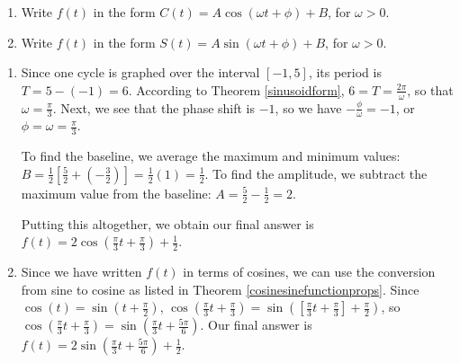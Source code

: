 \documentclass{ximera}
\begin{document}
\begin{example}
\begin{image}
\end{image}

\begin{enumerate}

\item Write $f(t)$ in the form  $C(t) = A \cos(\omega t + \phi) + B$, for $\omega > 0$.

\item Write $f(t)$ in the form  $S(t) = A \sin(\omega t + \phi) + B$, for $\omega > 0$.

\end{enumerate}

\begin{explanation}

\begin{enumerate}

\item  Since one cycle is graphed over the interval $[-1,5]$, its period is $T=5-(-1) = 6$.  According to Theorem \ref{sinusoidform}, $6 = T = \frac{2\pi}{\omega}$, so that $\omega = \frac{\pi}{3}$.  Next, we see that the phase shift is $-1$, so we have $-\frac{\phi}{\omega} = -1$, or $\phi = \omega = \frac{\pi}{3}$.  



To find the baseline, we average the maximum and minimum values:  $B = \frac{1}{2}\left[ \frac{5}{2} + \left(-\frac{3}{2}\right)\right] = \frac{1}{2}(1) = \frac{1}{2}$.  To find the amplitude, we subtract the maximum value from the baseline:  $A = \frac{5}{2} - \frac{1}{2}  = 2$.  



Putting this altogether, we obtain our final answer is $f(t) = 2 \cos\left(\frac{\pi}{3} t + \frac{\pi}{3} \right) + \frac{1}{2}$. 


\item  Since we have written $f(t)$ in terms of cosines, we can use the conversion from sine to cosine as listed in Theorem \ref{cosinesinefunctionprops}.  Since $\cos(t) = \sin\left(t +\frac{\pi}{2} \right)$, $\cos\left(\frac{\pi}{3} t + \frac{\pi}{3} \right)  = \sin\left( \left[\frac{\pi}{3} t + \frac{\pi}{3}\right] + \frac{\pi}{2} \right)$, so   $\cos\left(\frac{\pi}{3} t + \frac{\pi}{3} \right) = \sin\left(\frac{\pi}{3} t + \frac{5\pi}{6} \right)$.  Our final answer is $f(t) = 2 \sin\left(\frac{\pi}{3} t + \frac{5\pi}{6} \right) + \frac{1}{2}$.




\end{enumerate}
\end{explanation}
\end{example}
\end{document}
